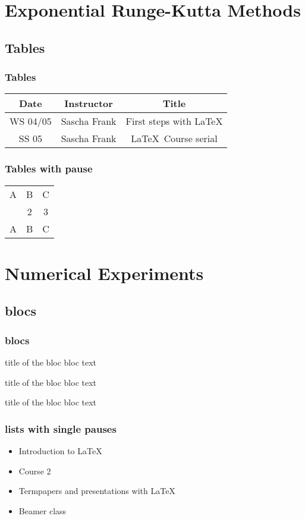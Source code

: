\documentclass[hyperref={pdfpagelabels=false}]{beamer}
\begin{document}
\section{Exponential Runge-Kutta Methods} 
\subsection{Tables}
\begin{frame}
	\frametitle{Tables}
	\begin{tabular}{|c|c|c|}
		\hline
		\textbf{Date} & \textbf{Instructor} & \textbf{Title} \\
		\hline
		WS 04/05 & Sascha Frank & First steps with  \LaTeX  \\
		\hline
		SS 05 & Sascha Frank & \LaTeX \ Course serial \\
		\hline
	\end{tabular}
\end{frame}


\begin{frame}
	\frametitle{Tables with pause}
	\begin{tabular}{c c c}
		A & B & C \\ 
		\pause 
		1 & 2 & 3 \\  
		\pause 
		A & B & C \\ 
	\end{tabular} 
\end{frame}


\section{Numerical Experiments}
\subsection{blocs}
\begin{frame}
\frametitle{blocs}

\begin{block}{title of the bloc}
bloc text
\end{block}

\begin{exampleblock}{title of the bloc}
bloc text
\end{exampleblock}


\begin{alertblock}{title of the bloc}
bloc text
\end{alertblock}
\end{frame}


\begin{frame}\frametitle{lists with single pauses}
	\begin{itemize}
		\item Introduction to  \LaTeX{}  \pause 
		\item Course 2 \pause 
		\item Termpapers and presentations with \LaTeX{}  \pause 
		\item Beamer class
	\end{itemize} 
\end{frame}
\end{document}
